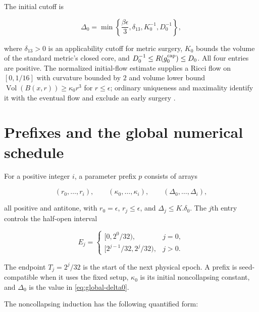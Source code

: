 The initial cutoff is

\begin{equation}
 \Delta_0=\min\left\{\frac{\beta\epsilon}{3},\delta_{13},
       K_0^{-1},D_0^{-1}\right\},
 \label{eq:global-delta0}
\end{equation}

where $\delta_{13}>0$ is an applicability cutoff for metric surgery,
$K_0$ bounds the volume of the standard metric's closed core, and
$D_0^{-1}\leq R(g_0^{\rm cap})\leq D_0$. All four entries are positive.
The normalized initial-flow estimate supplies a Ricci flow on
$[0,1/16]$ with curvature bounded by $2$ and volume lower bound
$\operatorname{Vol}(B(x,r))\geq\kappa_0r^3$ for $r\leq\epsilon$; ordinary
uniqueness and maximality identify it with the eventual flow and exclude an
early surgery \cite[Claim 15.1, p.~353; Definition 15.7, p.~360]{MT2007}.

\section{Prefixes and the global numerical schedule}
\label{sec:global-prefixes}

For a positive integer $i$, a parameter prefix $p$ consists of arrays

\[
 (r_0,\ldots,r_i),\qquad (\kappa_0,\ldots,\kappa_i),\qquad
 (\Delta_0,\ldots,\Delta_i),
\]

all positive and antitone, with $r_0=\epsilon$, $r_j\leq\epsilon$, and
$\Delta_j\leq K.\delta_0$.  The $j$th entry controls the half-open interval

\begin{equation}
 E_j=\begin{cases}
 [0,2^0/32),&j=0,\\
 [2^{j-1}/32,2^j/32),&j>0.
 \end{cases}
 \label{eq:global-entry}
\end{equation}

The endpoint $T_j=2^j/32$ is the start of the next physical epoch.  A
prefix is seed-compatible when it uses the fixed setup,
$\kappa_0$ is its initial noncollapsing constant, and $\Delta_0$ is the value in
\eqref{eq:global-delta0}.

The noncollapsing induction has the following quantified form:

